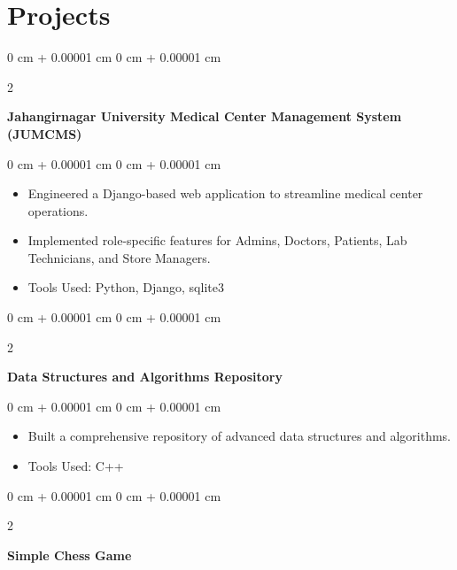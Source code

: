 \documentclass[10pt, letterpaper]{article}
\newenvironment{highlights}{
	\begin{itemize}[
		topsep=0.10 cm,
		parsep=0.10 cm,
		partopsep=0pt,
		itemsep=0pt,
		leftmargin=0 cm + 10pt
		]
	}{
	\end{itemize}
} %
\newenvironment{onecolentry}{
	\begin{adjustwidth}{
			0 cm + 0.00001 cm
		}{
			0 cm + 0.00001 cm
		}
	}{
	\end{adjustwidth}
} %
\newenvironment{twocolentry}[2][]{
	\onecolentry
	\def\secondColumn{#2}
	\setcolumnwidth{\fill, 4.5 cm}
	\begin{paracol}{2}
	}{
		\switchcolumn \raggedleft \secondColumn
	\end{paracol}
	\endonecolentry
} %
\begin{document}
	
	
	
	
	\section{Projects}
	
	
	
	
\begin{twocolentry}{
		\href{https://github.com/sudiptarathi2020/JUMCMS-Jahangirnagar-University-Medical-Center-Management-System/}{{\faGithub}}
	}
	\textbf{Jahangirnagar University Medical Center Management System (JUMCMS)}
\end{twocolentry}

	
	\vspace{0.10 cm}
	\begin{onecolentry}
		\begin{highlights}
			\item Engineered a Django-based web application to streamline medical center operations.
			\item Implemented role-specific features for Admins, Doctors, Patients, Lab Technicians, and Store Managers.
			\item Tools Used: Python, Django, sqlite3
		\end{highlights}
	\end{onecolentry}
	
	
	\vspace{0.2 cm}
	
	\begin{twocolentry}{
			\href{https://github.com/sudiptarathi2020/Data-structures-and-Algorithms}{{\faGithub}}
		}
		\textbf{Data Structures and Algorithms Repository}\end{twocolentry}
	
	\vspace{0.10 cm}
	\begin{onecolentry}
		\begin{highlights}
			\item Built a comprehensive repository of advanced data structures and algorithms.
			\item Tools Used: C++
		\end{highlights}
	\end{onecolentry}
	
	
	\vspace{0.2 cm}
	
	\begin{twocolentry}{
			\href{https://github.com/sudiptarathi2020/Simple-Chess-Game}{{\faGithub}}
		}
		\textbf{Simple Chess Game}\end{twocolentry}
	
\end{document}
